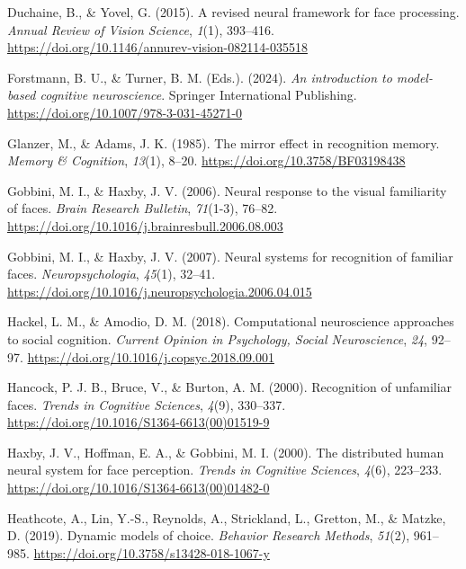 \documentclass[
  letterpaper,
  DIV=11,
  numbers=noendperiod]{scrartcl}
\newlength{\cslhangindent}
\newenvironment{CSLReferences}[2] %
 {\begin{list}{}{%
  \setlength{\itemindent}{0pt}
  \setlength{\leftmargin}{0pt}
  \setlength{\parsep}{0pt}
  \ifodd #1
   \setlength{\leftmargin}{\cslhangindent}
   \setlength{\itemindent}{-1\cslhangindent}
  \fi
  \setlength{\itemsep}{#2\baselineskip}}}
 {\end{list}}
\begin{document}
\begin{CSLReferences}{1}{0}
Duchaine, B., \& Yovel, G. (2015). A revised neural framework for face
processing. \emph{Annual Review of Vision Science}, \emph{1}(1),
393--416. \url{https://doi.org/10.1146/annurev-vision-082114-035518}

Forstmann, B. U., \& Turner, B. M. (Eds.). (2024). \emph{An introduction
to model-based cognitive neuroscience}. Springer International
Publishing. \url{https://doi.org/10.1007/978-3-031-45271-0}

Glanzer, M., \& Adams, J. K. (1985). The mirror effect in recognition
memory. \emph{Memory \& Cognition}, \emph{13}(1), 8--20.
\url{https://doi.org/10.3758/BF03198438}

Gobbini, M. I., \& Haxby, J. V. (2006). Neural response to the visual
familiarity of faces. \emph{Brain Research Bulletin}, \emph{71}(1-3),
76--82. \url{https://doi.org/10.1016/j.brainresbull.2006.08.003}

Gobbini, M. I., \& Haxby, J. V. (2007). Neural systems for recognition
of familiar faces. \emph{Neuropsychologia}, \emph{45}(1), 32--41.
\url{https://doi.org/10.1016/j.neuropsychologia.2006.04.015}

Hackel, L. M., \& Amodio, D. M. (2018). Computational neuroscience
approaches to social cognition. \emph{Current Opinion in Psychology,
Social Neuroscience}, \emph{24}, 92--97.
\url{https://doi.org/10.1016/j.copsyc.2018.09.001}

Hancock, P. J. B., Bruce, V., \& Burton, A. M. (2000). Recognition of
unfamiliar faces. \emph{Trends in Cognitive Sciences}, \emph{4}(9),
330--337. \url{https://doi.org/10.1016/S1364-6613(00)01519-9}

Haxby, J. V., Hoffman, E. A., \& Gobbini, M. I. (2000). The distributed
human neural system for face perception. \emph{Trends in Cognitive
Sciences}, \emph{4}(6), 223--233.
\url{https://doi.org/10.1016/S1364-6613(00)01482-0}

Heathcote, A., Lin, Y.-S., Reynolds, A., Strickland, L., Gretton, M., \&
Matzke, D. (2019). Dynamic models of choice. \emph{Behavior Research
Methods}, \emph{51}(2), 961--985.
\url{https://doi.org/10.3758/s13428-018-1067-y}


\end{CSLReferences}
\end{document}
